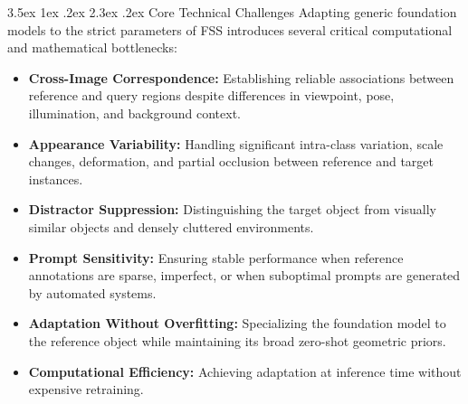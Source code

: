 \documentclass[journal,12pt,onecolumn,draftclsnofoot]{IEEEtran}
\makeatletter
\renewcommand{\section}{\@startsection{section}{1}{\z@}%
    {3.5ex \@plus 1ex \@minus .2ex}%
    {2.3ex \@plus.2ex}%
    {\normalfont\Large\bfseries}}
\makeatother
\begin{document}
\section{Core Technical Challenges}
Adapting generic foundation models to the strict parameters of FSS introduces several critical computational and mathematical bottlenecks:
\begin{itemize}
    \item \textbf{Cross-Image Correspondence:} Establishing reliable associations between reference and query regions despite differences in viewpoint, pose, illumination, and background context.
    \item \textbf{Appearance Variability:} Handling significant intra-class variation, scale changes, deformation, and partial occlusion between reference and target instances.
    \item \textbf{Distractor Suppression:} Distinguishing the target object from visually similar objects and densely cluttered environments.
    \item \textbf{Prompt Sensitivity:} Ensuring stable performance when reference annotations are sparse, imperfect, or when suboptimal prompts are generated by automated systems.
    \item \textbf{Adaptation Without Overfitting:} Specializing the foundation model to the reference object while maintaining its broad zero-shot geometric priors.
    \item \textbf{Computational Efficiency:} Achieving adaptation at inference time without expensive retraining.
\end{itemize}
\end{document}

